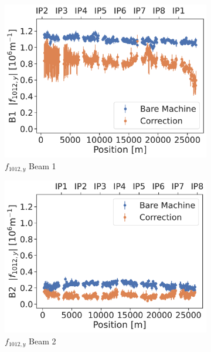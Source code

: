 \begin{figure}[!htb]
    \centering
    \begin{subfigure}{0.49\textwidth}
        \includegraphics[width=\textwidth]{./images/f1012_b1.pdf}
        \caption{$f_{1012,y}$ Beam 1}
    \end{subfigure}
    \hfill
    \begin{subfigure}{0.49\textwidth}
        \includegraphics[width=\textwidth]{./images/f1012_b2.pdf}
        \caption{$f_{1012,y}$ Beam 2}
    \end{subfigure}
    \par\bigskip 
    \begin{subfigure}{0.49\textwidth}

\end{subfigure}
\end{figure}
